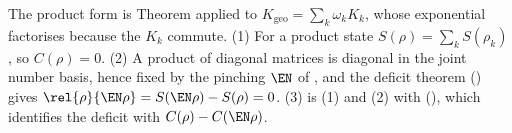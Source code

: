 The product form is Theorem  applied to $K_{\mathrm{geo}} = \sum_k \omega_k K_k$, whose exponential factorises because the $K_k$ commute. (1) For a product state $S(\rho) = \sum_k S(\rho_k)$, so $C(\rho) = 0$. (2) A product of diagonal matrices is diagonal in the joint number basis, hence fixed by the pinching $\EN$ of \cite[Def.~9.1]{ButlerT5}, and the deficit theorem () gives $\rel{\rho}{\EN\rho} = S(\EN\rho) - S(\rho) = 0$. (3) is (1) and (2) with \cite[Cor.~9.4]{ButlerT5} (), which identifies the deficit with $C(\rho) - C(\EN\rho)$.
